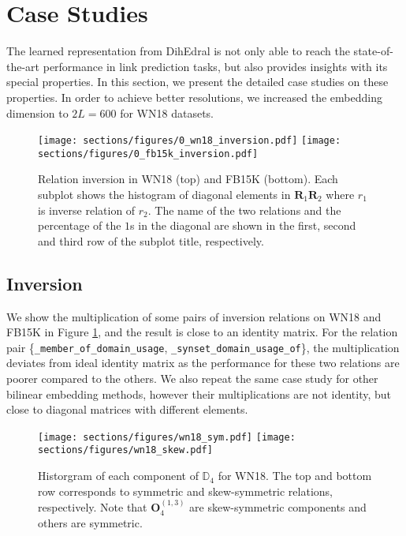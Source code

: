 \documentclass[11pt,a4paper]{article}
\begin{document}
 
\section{Case Studies} \label{sec: case_studies}
The learned representation from DihEdral is not only able to reach the state-of-the-art performance in link prediction tasks, but also provides insights with its special properties. In this section, we present the detailed case studies on these properties. In order to achieve better resolutions, we increased the embedding dimension to $2L=600$ for WN18 datasets.

\begin{figure}[h]
\texttt{[image: sections/figures/0\_wn18\_inversion.pdf]}
\texttt{[image: sections/figures/0\_fb15k\_inversion.pdf]}
\caption{Relation inversion in WN18 (top) and FB15K (bottom). Each subplot shows the histogram of diagonal elements in $\bm{R}_1\bm{R}_2$ where $r_1$ is inverse relation of $r_2$. The name of the two relations and the percentage of the $1$s in the diagonal are shown in the first, second and third row of the subplot title, respectively.}\label{fig: inversion}
\end{figure}

\subsection{Inversion} \label{subsec: inversion}
We show the multiplication of some pairs of inversion relations on WN18 and FB15K in Figure \ref{fig: inversion}, and the result is close to an identity matrix. 
 For the relation pair \{\verb|_member_of_domain_usage|, \verb|_synset_domain_usage_of|\}, the multiplication deviates from ideal identity matrix as the performance for these two relations are poorer compared to the others. 
 We also repeat the same case study for other bilinear embedding methods, however their multiplications are not identity, but close to diagonal matrices with different elements.

\begin{figure}[h]
 \texttt{[image: sections/figures/wn18\_sym.pdf]}
 \texttt{[image: sections/figures/wn18\_skew.pdf]}
\caption{Historgram of each component of $\mathbb{D}_4$ for WN18. The top and bottom row corresponds to symmetric and skew-symmetric  relations, respectively. Note that $\bm{O}_4^{(1, 3)}$ are skew-symmetric components and others are symmetric.}\label{figure: sym_skew_sym}
\end{figure}
\end{document}
